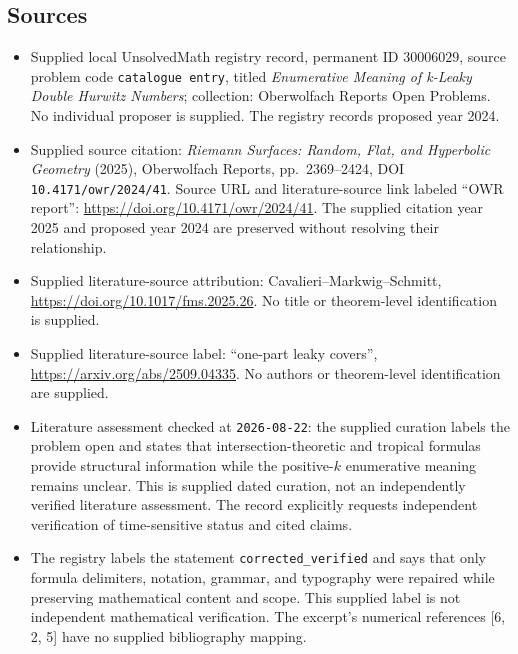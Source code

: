 \documentclass[11pt]{article}
\begin{document}
\subsection{Sources}
\begin{itemize}
\item Supplied local UnsolvedMath registry record, permanent ID \(30006029\), source problem code \texttt{catalogue entry}, titled \emph{Enumerative Meaning of k-Leaky Double Hurwitz Numbers}; collection: Oberwolfach Reports Open Problems. No individual proposer is supplied. The registry records proposed year 2024.
\item Supplied source citation: \emph{Riemann Surfaces: Random, Flat, and Hyperbolic Geometry} (2025), Oberwolfach Reports, pp.\ 2369--2424, DOI \texttt{10.4171/owr/2024/41}. Source URL and literature-source link labeled ``OWR report'': \url{https://doi.org/10.4171/owr/2024/41}. The supplied citation year 2025 and proposed year 2024 are preserved without resolving their relationship.
\item Supplied literature-source attribution: Cavalieri--Markwig--Schmitt, \url{https://doi.org/10.1017/fms.2025.26}. No title or theorem-level identification is supplied.
\item Supplied literature-source label: ``one-part leaky covers'', \url{https://arxiv.org/abs/2509.04335}. No authors or theorem-level identification are supplied.
\item Literature assessment checked at \texttt{2026-08-22}: the supplied curation labels the problem open and states that intersection-theoretic and tropical formulas provide structural information while the positive-\(k\) enumerative meaning remains unclear. This is supplied dated curation, not an independently verified literature assessment. The record explicitly requests independent verification of time-sensitive status and cited claims.
\item The registry labels the statement \texttt{corrected\_verified} and says that only formula delimiters, notation, grammar, and typography were repaired while preserving mathematical content and scope. This supplied label is not independent mathematical verification. The excerpt's numerical references [6, 2, 5] have no supplied bibliography mapping.
\end{itemize}
\end{document}
